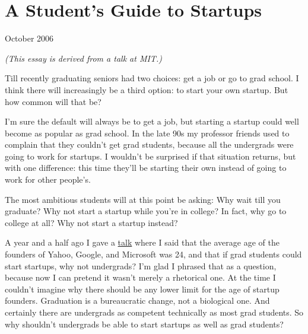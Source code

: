 \chapter{A Student's Guide to Startups}


            
              
                


                  
                    October 2006

\emph{(This essay is derived from a talk at MIT.)}

Till recently graduating seniors had two
                    choices: get a job or go to grad school. I think there will
                    increasingly be a third option: to start your own startup.
                    But how common will that be?

I'm sure the default
                    will always be to get a job, but starting a startup could
                    well become as popular as grad school. In the late 90s my
                    professor friends used to complain that they couldn't get
                    grad students, because all the undergrads were going to work
                    for startups. I wouldn't be surprised if that situation
                    returns, but with one difference: this time they'll be
                    starting their own instead of going to work for other
                    people's.

The most ambitious students will at
                    this point be asking: Why wait till you graduate? Why not
                    start a startup while you're in college? In fact, why go to
                    college at all? Why not start a startup instead?

A
                    year and a half ago I gave a
                    \href{http://www.paulgraham.com/hiring.html}{talk} where I said that the average
                    age of the founders of Yahoo, Google, and Microsoft was 24,
                    and that if grad students could start startups, why not
                    undergrads? I'm glad I phrased that as a question, because
                    now I can pretend it wasn't merely a rhetorical one. At the
                    time I couldn't imagine why there should be any lower limit
                    for the age of startup founders. Graduation is a
                    bureaucratic change, not a biological one. And certainly
                    there are undergrads as competent technically as most grad
                    students. So why shouldn't undergrads be able to start
                    startups as well as grad students?

